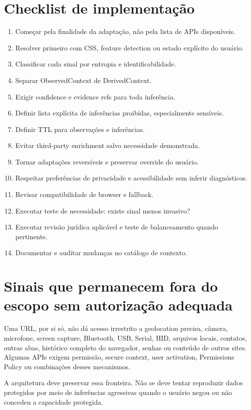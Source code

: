 \documentclass[11pt,a4paper]{article}
\begin{document}
\section{Checklist de implementação}
\begin{enumerate}
\item Começar pela finalidade da adaptação, não pela lista de APIs disponíveis.
\item Resolver primeiro com CSS, feature detection ou estado explícito do usuário.
\item Classificar cada sinal por entropia e identificabilidade.
\item Separar ObservedContext de DerivedContext.
\item Exigir confidence e evidence refs para toda inferência.
\item Definir lista explícita de inferências proibidas, especialmente sensíveis.
\item Definir TTL para observações e inferências.
\item Evitar third-party enrichment salvo necessidade demonstrada.
\item Tornar adaptações reversíveis e preservar override do usuário.
\item Respeitar preferências de privacidade e acessibilidade sem inferir diagnósticos.
\item Revisar compatibilidade de browser e fallback.
\item Executar teste de necessidade: existe sinal menos invasivo?
\item Executar revisão jurídica aplicável e teste de balanceamento quando pertinente.
\item Documentar e auditar mudanças no catálogo de contexto.
\end{enumerate}

\section{Sinais que permanecem fora do escopo sem autorização adequada}
Uma URL, por si só, não dá acesso irrestrito a geolocation precisa, câmera, microfone, screen capture, Bluetooth, USB, Serial, HID, arquivos locais, contatos, outras abas, histórico completo do navegador, senhas ou conteúdo de outros sites. Algumas APIs exigem permissão, secure context, user activation, Permissions Policy ou combinações desses mecanismos.

A arquitetura deve preservar essa fronteira. Não se deve tentar reproduzir dados protegidos por meio de inferências agressivas quando o usuário negou ou não concedeu a capacidade protegida.
\end{document}
